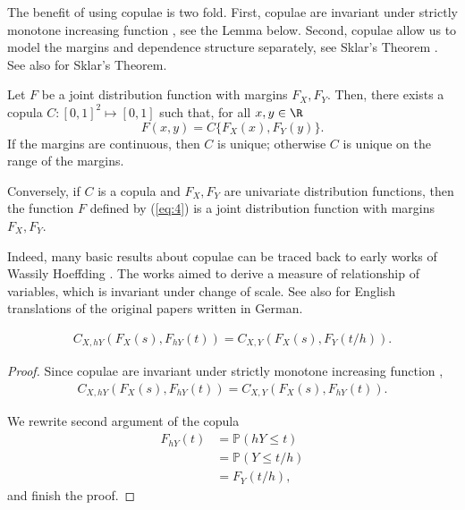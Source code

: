 The benefit of using copulae is two fold.
First, copulae are invariant under strictly
monotone increasing function \citep{schweizer1981nonparametric}, see the Lemma below.
Second, copulae allow us to model the  margins and dependence structure separately, see Sklar's Theorem
\citep{Sklar1959}.
See also \citep{Nelsen1999, joe1997multivariate, McNeil2005} for Sklar's Theorem. \medskip

\begin{theorem}
  Let $F$ be a joint distribution function with margins $F_X,
  F_Y$. Then, there exists a copula $C:[0,1]^2 \mapsto [0,1]$ such
  that, for all $x,y\in \R$
  \begin{equation}
    \label{eq:4}
    F(x,y)=C\{F_X(x), F_Y(y)\}.
  \end{equation}
  If the margins are continuous, then $C$ is unique; otherwise $C$ is
  unique on the range of the margins.

  Conversely, if $C$ is a copula and $F_X, F_Y$ are univariate
  distribution functions, then the function $F$ defined by (\ref{eq:4})
  is a joint distribution function with margins $F_X, F_Y$.
\end{theorem}

Indeed, many basic results about copulae can be traced back to early
works of Wassily Hoeffding \citep{hoedffding1940, hoedffding1941}. 
The works aimed to derive a measure of relationship of variables,
which is invariant under change of scale. 
See also \citet{hoeffding2012collected} for English translations of
the original papers written in German. 

\begin{lemma}
  \begin{align}
  C_{X, hY}\left(F_X(s),F_{hY}(t)\right) = C_{X, Y}\left(F_X(s),F_{Y}(t/h)\right).
    \end{align}
  \end{lemma}

\begin{proof}
  Since copulae are invariant under strictly monotone increasing function \cite[Theorem 3 (i)]{schweizer1981nonparametric},
  \begin{align*}
    C_{X, hY}\left(F_X(s),F_{hY}(t)\right) = C_{X, Y}\left(F_X(s),F_{hY}(t)\right).
    \end{align*}

  We rewrite second argument of the copula
  \begin{align*}
    F_{hY}(t) &= \mathbb{P}(hY \leq t)\\
              &= \mathbb{P}(Y \leq t/h)\\
              &= F_Y(t/h),
    \end{align*}
  and finish the proof.
  \end{proof}

